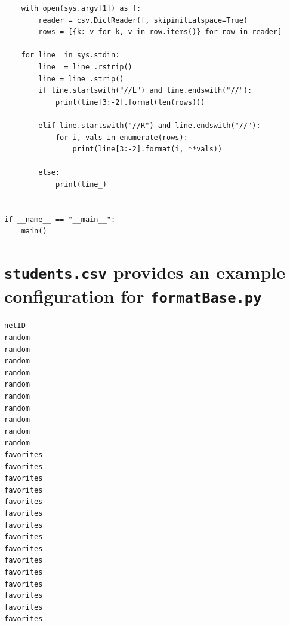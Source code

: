 \documentclass[pageno]{jpaper}
\begin{document}
\begin{appendices}
\begin{verbatim}
    with open(sys.argv[1]) as f:
        reader = csv.DictReader(f, skipinitialspace=True)
        rows = [{k: v for k, v in row.items()} for row in reader]

    for line_ in sys.stdin:
        line_ = line_.rstrip()
        line = line_.strip()
        if line.startswith("//L") and line.endswith("//"):
            print(line[3:-2].format(len(rows)))

        elif line.startswith("//R") and line.endswith("//"):
            for i, vals in enumerate(rows):
                print(line[3:-2].format(i, **vals))

        else:
            print(line_)


if __name__ == "__main__":
    main()

\end{verbatim}

  \newpage
  \section{\texttt{students.csv} provides an example configuration for \texttt{formatBase.py}}\label{appendix:students}
\begin{verbatim}
netID
random
random
random
random
random
random
random
random
random
random
favorites
favorites
favorites
favorites
favorites
favorites
favorites
favorites
favorites
favorites
favorites
favorites
favorites
favorites
favorites
\end{verbatim}
\end{appendices}
\end{document}
